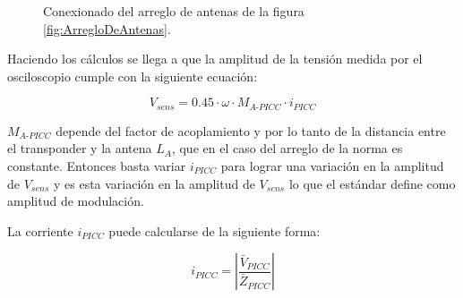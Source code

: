 \begin{figure}
	\centering
	\shorthandoff{<>}
	\shorthandon{<>}
	\caption{Conexionado del arreglo de antenas de la figura \ref{fig:ArregloDeAntenas}.}
	\label{fig:ModeloDelArregloParaModulacionDeCarga}
\end{figure}

Haciendo los cálculos se llega a que la 
amplitud de la tensión medida por el osciloscopio cumple con la siguiente 
ecuación:

\begin{equation}
	\label{eq:Vsens}
	V_{sens} = 0.45 \cdot \omega \cdot M_{A\text{-}PICC} \cdot i_{PICC}
\end{equation}

\(M_{A\text{-}PICC}\) depende del factor de acoplamiento y por lo tanto de 
la distancia entre el transponder y la antena \(L_A\), que en el caso del 
arreglo de la norma es constante. Entonces basta variar \(i_{PICC}\) para 
lograr una variación en la amplitud de \(V_{sens}\) y es esta variación en 
la amplitud de \(V_{sens}\) lo que el estándar define como amplitud de 
modulación.

La corriente \(i_{PICC}\) puede calcularse de la siguiente forma:

\begin{equation}
	i_{PICC} = \left|\frac{\bar{V}_{PICC}}{\bar{Z}_{PICC}}\right|
\end{equation}

